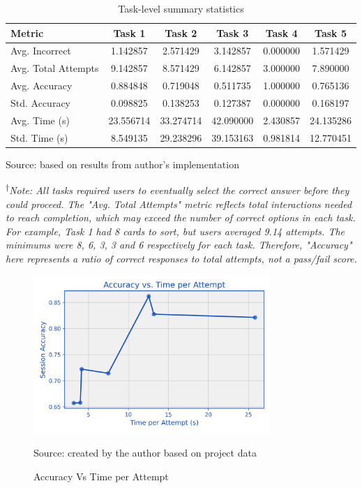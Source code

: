 \begin{table}[ht]
\centering
\captionsetup{justification=raggedright, singlelinecheck=false}
\caption{Task-level summary statistics}
\begin{tabular}{lccccc}
\toprule
\textbf{Metric} & \textbf{Task 1} & \textbf{Task 2} & \textbf{Task 3} & \textbf{Task 4} & \textbf{Task 5} \\
\midrule
Avg. Incorrect     & 1.142857 & 2.571429 & 3.142857 & 0.000000 & 1.571429 \\
Avg. Total Attempts& 9.142857 & 8.571429 & 6.142857 & 3.000000 & 7.890000 \\
Avg. Accuracy      & 0.884848 & 0.719048 & 0.511735 & 1.000000 & 0.765136 \\
Std. Accuracy      & 0.098825 & 0.138253 & 0.127387 & 0.000000 & 0.168197 \\
Avg. Time (s)      & 23.556714 & 33.274714 & 42.090000 & 2.430857 & 24.135286 \\
Std. Time (s)      & 8.549135 & 29.238296 & 39.153163 & 0.981814 & 12.770451 \\
\bottomrule
\end{tabular}
\label{tab:task_summary_vertical}
\end{table}
{\raggedright \small{Source: based on results from author's implementation}\par}
\begin{flushleft}
\textsuperscript{†}\textit{Note: All tasks required users to eventually select the correct answer before they could proceed. The "Avg. Total Attempts" metric reflects total interactions needed to reach completion, which may exceed the number of correct options in each task. For example, Task 1 had 8 cards to sort, but users averaged 9.14 attempts. The minimums were 8, 6, 3, 3 and 6 respectively for each task. Therefore, "Accuracy" here represents a ratio of correct responses to total attempts, not a pass/fail score.}
\end{flushleft}


\begin{figure}[hbtp]
\centering
\includegraphics[width=0.8\textwidth]{figures/accuracy_vs_time.png}
\caption{Accuracy Vs Time per Attempt}
\label{fig:acc}
{\raggedright \small{Source: created by the author based on project data}\par}
\end{figure}

